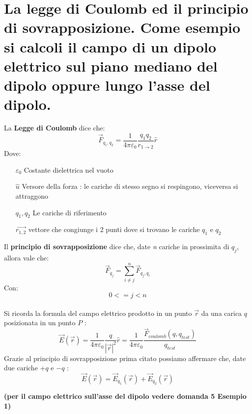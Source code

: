 \section{La legge di Coulomb ed il principio di sovrapposizione.
	Come esempio si calcoli il campo di un dipolo elettrico sul
	piano mediano del dipolo oppure lungo l'asse del dipolo.}
La \textbf{Legge di Coulomb} dice che:
\begin{equation}
  \vec{F}_{q_1, q_2} = \frac{1}{4 \pi \varepsilon_0} \frac{q_1 q_2}{r_{1 \rightarrow 2}}\hat{r}
\end{equation}
Dove:
\begin{itemize}
	\item[$ \varepsilon_0$] {Costante dielettrica nel vuoto}
	\item[$ \hat{u} $] {Versore della forza : le cariche di stesso segno si respingono, viceversa si attraggono}
	\item[$ q_1, q_2 $] {Le cariche di riferimento}
	\item[$ \vec{r_{1, 2}} $] {vettore che congiunge i 2 punti dove si trovano le cariche $ q_1 $ e $ q_2 $}
\end{itemize}
Il \textbf{principio di sovrapposizione} dice che, date \emph{n} cariche in prossimita di $ q_j $, allora vale che:
\begin{equation}
    \vec{F}_{q_j} = \sum_{i \neq j}^{n}{\vec{F}_{q_j, q_i}}
\end{equation}
Con:
$$ 0 <= j < n $$
\\
Si ricorda la formula del campo elettrico prodotto  in un punto $\vec{r}$ da una carica $q$ posizionata in un punto $P$ :
\begin{displaymath}
\vec{E}\left( \vec{r} \right) = 
\frac{1}{4 \pi \varepsilon_0} \frac{q}{|\vec{r}|^2} \hat{r} = 
\frac{1}{4 \pi \varepsilon_0} \frac{\vec{F}_{coulomb} (q, q_{test})}{q_{test}} 
\end{displaymath}
Grazie al principio di sovrapposizione prima citato possiamo affermare che, date due cariche $+q$ e $-q$ :
\begin{equation}
\vec{E}\left( \vec{r} \right) = 
\vec{E}_{q_1}\left( \vec{r} \right) + \vec{E}_{q_2}\left( \vec{r} \right)
\end{equation}

\begin{center}
    \textbf{(per il  campo elettrico sull'asse del dipolo vedere domanda 5 Esempio 1)}
\end{center}